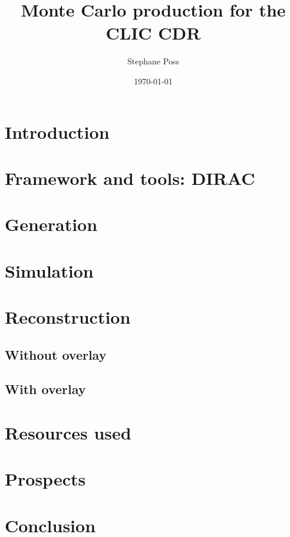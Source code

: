 \documentclass{article}
\author{Stephane Poss}
\title{Monte Carlo production for the CLIC CDR}
\date{\today}
\begin{document}
\maketitle

\section{Introduction}

\section{Framework and tools: DIRAC}

\section{Generation}

\section{Simulation}

\section{Reconstruction}
\subsection{Without overlay}

\subsection{With overlay}

\section{Resources used}

\section{Prospects}
\section{Conclusion}
\end{document}
